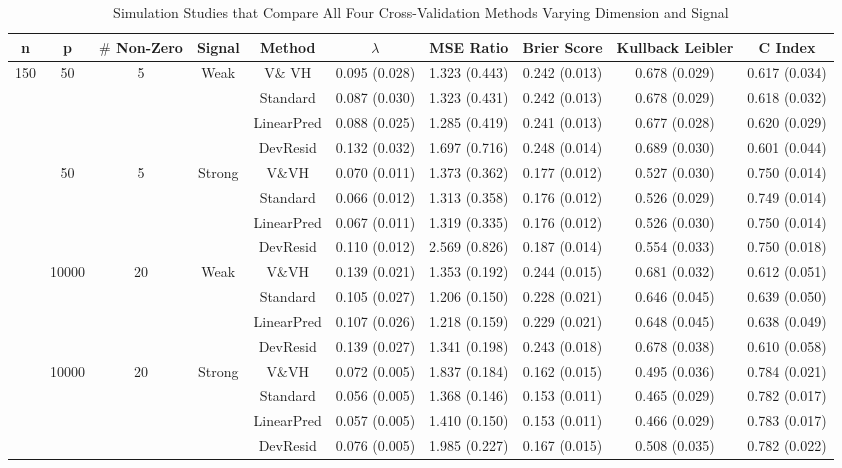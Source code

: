 \begin{table}[h]

\setlength{\tabcolsep}{3pt}

\caption{\label{tab:} Simulation Studies that Compare All Four Cross-Validation Methods Varying Dimension and Signal }
\centering
\begin{tabular}[t]{cccccccccc}
\toprule
 n& p& $\#$ Non-Zero & Signal & Method & $\lambda$ & MSE Ratio &Brier Score & Kullback Leibler & C Index\\
\midrule
150 & 50 & 5 & Weak & V$\&$ VH  & 0.095 (0.028) & 1.323 (0.443) & 0.242 (0.013) & 0.678 (0.029) & 0.617 (0.034) \\
      &    &   &     & Standard  & 0.087 (0.030) & 1.323 (0.431) & 0.242 (0.013) & 0.678 (0.029) & 0.618 (0.032) \\
      &    &   &     & LinearPred  & 0.088 (0.025) & 1.285 (0.419) & 0.241 (0.013) & 0.677 (0.028) & 0.620 (0.029) \\
      &    &   &     & DevResid  & 0.132 (0.032) & 1.697 (0.716) & 0.248 (0.014) & 0.689 (0.030) & 0.601 (0.044) \\
\addlinespace
150 & 50 & 5 & Strong & V$\&$VH  & 0.070 (0.011) & 1.373 (0.362) & 0.177 (0.012) & 0.527 (0.030) & 0.750 (0.014) \\
    &    &   &     & Standard  & 0.066 (0.012) & 1.313 (0.358) & 0.176 (0.012) & 0.526 (0.029) & 0.749 (0.014) \\
    &    &   &     & LinearPred  & 0.067 (0.011) & 1.319 (0.335) & 0.176 (0.012) & 0.526 (0.030) & 0.750 (0.014) \\
    &    &   &     & DevResid  & 0.110 (0.012) & 2.569 (0.826) & 0.187 (0.014) & 0.554 (0.033) & 0.750 (0.018) \\
\addlinespace
300 & 10000 & 20 & Weak & V$\&$VH  & 0.139 (0.021) & 1.353 (0.192) & 0.244 (0.015) & 0.681 (0.032) & 0.612 (0.051) \\
      &    &   &     & Standard  & 0.105 (0.027) & 1.206 (0.150) & 0.228 (0.021) & 0.646 (0.045) & 0.639 (0.050) \\
      &    &   &     & LinearPred  & 0.107 (0.026) & 1.218 (0.159) & 0.229 (0.021) & 0.648 (0.045) & 0.638 (0.049) \\
      &    &   &     & DevResid  & 0.139 (0.027) & 1.341 (0.198) & 0.243 (0.018) & 0.678 (0.038) & 0.610 (0.058) \\
\addlinespace
500 & 10000 & 20 & Strong & V$\&$VH  & 0.072 (0.005) & 1.837 (0.184) & 0.162 (0.015) & 0.495 (0.036) & 0.784 (0.021) \\
      &    &   &     & Standard  & 0.056 (0.005) & 1.368 (0.146) & 0.153 (0.011) & 0.465 (0.029) & 0.782 (0.017) \\
      &    &   &     & LinearPred  & 0.057 (0.005) & 1.410 (0.150) & 0.153 (0.011) & 0.466 (0.029) & 0.783 (0.017) \\
      &    &   &     & DevResid  & 0.076 (0.005) & 1.985 (0.227) & 0.167 (0.015) & 0.508 (0.035) & 0.782 (0.022) \\
\bottomrule
\end{tabular}
\end{table}

